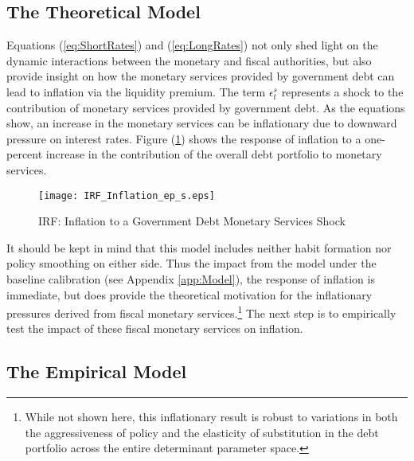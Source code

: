 \documentclass[11pt,a4paper,margin=1.5in]{article}
\begin{document}
\subsection{The Theoretical Model}
Equations (\ref{eq:ShortRates}) and (\ref{eq:LongRates}) not only shed light on the dynamic interactions between the monetary and fiscal authorities, but also provide insight on how the monetary services provided by government debt can lead to inflation via the liquidity premium.
The term $\epsilon^s_t$ represents a shock to the contribution of monetary services provided by government debt.
As the equations show, an increase in the monetary services can be inflationary due to downward pressure on interest rates. 
Figure (\ref{fig:IRF_Inflation_eps}) shows the response of inflation to a one-percent increase in the contribution of the overall debt portfolio to monetary services. 
\begin{figure}[h]
\centering
\caption{IRF: Inflation to a Government Debt Monetary Services Shock}
\label{fig:IRF_Inflation_eps}
\texttt{[image: IRF\_Inflation\_ep\_s.eps]}
\end{figure} 

It should be kept in mind that this model includes neither habit formation nor policy smoothing on either side.
Thus the impact from the model under the baseline calibration (see Appendix \ref{app:Model}), the response of inflation is immediate, but does provide the theoretical motivation for the inflationary pressures derived from fiscal monetary services.\footnote{While not shown here, this inflationary result is robust to variations in both the aggressiveness of policy and the elasticity of substitution in the debt portfolio across the entire determinant parameter space.}
The next step is to empirically test the impact of these fiscal monetary services on inflation.



\subsection{The Empirical Model}
\end{document}
